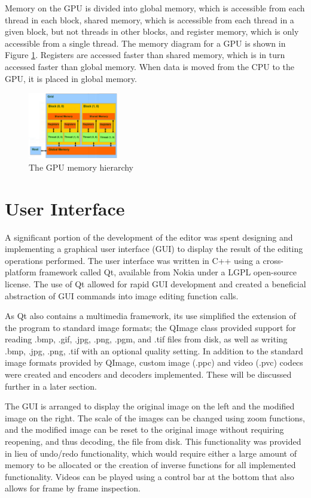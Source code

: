\documentclass[10pt,twocolumn,twoside]{IEEEtran}
\begin{document}
Memory on the GPU is divided into global memory, which is accessible from each thread in each block, shared memory, which is accessible from each thread in a given block, but not threads in other blocks, and register memory, which is only accessible from a single thread. The memory diagram for a GPU is shown in Figure \ref{fig:cudaMem}. Registers are accessed faster than shared memory, which is in turn accessed faster than global memory. When data is moved from the CPU to the GPU, it is placed in global memory.

\begin{figure}[h]
\begin{center}
\includegraphics[width=0.35\textwidth]{Images/cudaMem.png}
\caption{The GPU memory hierarchy}
\label{fig:cudaMem}
\end{center}
\end{figure}

\section{User Interface}
A significant portion of the development of the editor was spent designing and implementing a graphical user interface (GUI) to display the result of the editing operations performed. The user interface was written in C++ using a cross-platform framework called Qt, available from Nokia under a LGPL open-source license. The use of Qt allowed for rapid GUI development and created a beneficial abstraction of GUI commands into image editing function calls. 

As Qt also contains a multimedia framework, its use simplified the extension of the program to standard image formats; the QImage class provided support for reading .bmp, .gif, .jpg, .png, .pgm, and .tif files from disk, as well as writing .bmp, .jpg, .png, .tif with an optional quality setting. In addition to the standard image formats provided by QImage, custom image (.ppc) and video (.pvc) codecs were created and encoders and decoders implemented. These will be discussed further in a later section.

The GUI is arranged to display the original image on the left and the modified image on the right. The scale of the images can be changed using zoom functions, and the modified image can be reset to the original image without requiring reopening, and thus decoding, the file from disk. This functionality was provided in lieu of undo/redo functionality, which would require either a large amount of memory to be allocated or the creation of inverse functions for all implemented functionality. Videos can be played using a control bar at the bottom that also allows for frame by frame inspection.
\end{document}
